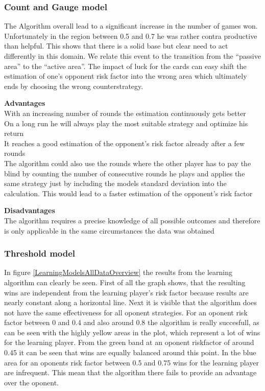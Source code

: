 \documentclass[11pt]{article}
\begin{document}
\subsubsection{Count and Gauge model}
The Algorithm overall lead to a significant increase in the number of games won. Unfortunately in the region between 0.5 and 0.7 he was rather contra productive than helpful. This shows that there is a solid base but clear need to act differently in this domain. 
We relate this event to the transition from the “passive area” to the “active area”. The impact of luck for the cards can easy shift the estimation of one’s opponent risk factor into the wrong area which ultimately ends by choosing the wrong counterstrategy.

\begin{minipage}[t]{0.48\textwidth}
\textbf{Advantages}\\
With an increasing number of rounds the estimation continuously gets better\\
On a long run he will always play the most suitable strategy and optimize his return\\
It reaches a good estimation of the opponent's risk factor already after a few rounds\\
The algorithm could also use the rounds where the other player has to pay the blind by counting the number of consecutive rounds he plays and applies the same strategy just by including the models standard deviation into the calculation. This would lead to a faster estimation of the opponent's risk factor
\end{minipage}\hfill
\begin{minipage}[t]{0.48\textwidth}
\textbf{Disadvantages}\\
The algorithm requires a precise knowledge of all possible outcomes and therefore is only applicable in the same circumstances the data was obtained\\
\end{minipage}

\subsubsection{Threshold model}

In figure \ref{LearningModelsAllDataOverview} the results from the learning algorithm can clearly be seen. First of all the graph shows, that the resulting wins are independent from the learning player's risk factor because results are nearly constant along a horizontal line. Next it is visible that the algorithm does not have the same effectiveness for all oponent strategies. For an oponent risk factor between 0 and 0.4 and also around 0.8 the algorithm is really succesfull, as can be seen with the highly yellow areas in the plot, which represent a lot of wins for the learning player. From the green band at an oponent riskfactor of around 0.45 it can be seen that wins are equally balanced around this point. In the blue area for an oponents risk factor between 0.5 and 0.75 wins for the learning player are infrequent. This mean that the algorithm there fails to provide an advantage over the oponent.\\
\end{document}
